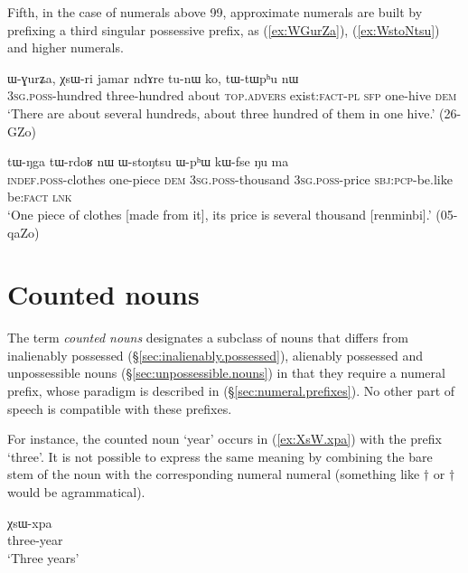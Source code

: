 Fifth, in the case of numerals above 99, approximate numerals are built by prefixing a third singular possessive  prefix, as  (\ref{ex:WGurZa}),  (\ref{ex:WstoNtsu}) and higher numerals.
 \largerpage
\begin{exe}
\ex \label{ex:WGurZa}
\gll  ɯ-ɣurʑa, χsɯ-ri jamar ndɤre tu-nɯ ko, tɯ-tɯpʰu nɯ  \\
\textsc{3sg}.\textsc{poss}-hundred three-hundred about \textsc{top}.\textsc{advers} exist:\textsc{fact}-\textsc{pl} \textsc{sfp} one-hive \textsc{dem} \\
\glt `There are about several hundreds, about three hundred of them in one hive.' (26-GZo)
\end{exe}

\begin{exe}
\ex \label{ex:WstoNtsu}
\gll  tɯ-ŋga tɯ-rdoʁ nɯ ɯ-stoŋtsu ɯ-pʰɯ kɯ-fse ŋu ma \\
\textsc{indef}.\textsc{poss}-clothes one-piece \textsc{dem} \textsc{3sg}.\textsc{poss}-thousand \textsc{3sg}.\textsc{poss}-price \textsc{sbj}:\textsc{pcp}-be.like be:\textsc{fact} \textsc{lnk} \\ 
\glt `One piece of clothes [made from it], its price is several thousand [renminbi].' (05-qaZo) 
\end{exe}

\section{Counted nouns} \label{sec:counted.nouns}
  
The term \textit{counted nouns} designates a subclass of nouns that differs from inalienably possessed (§\ref{sec:inalienably.possessed}), alienably possessed and unpossessible nouns (§\ref{sec:unpossessible.nouns}) in that they require a numeral prefix, whose paradigm is described in (§\ref{sec:numeral.prefixes}). No other part of speech is compatible with these prefixes.

For instance, the counted noun  `year' occurs in (\ref{ex:XsW.xpa}) with the prefix  `three'. It is not possible to express the same meaning by combining the bare stem of the noun  with the corresponding numeral numeral  (something  like  $\dagger$ or $\dagger$ would be agrammatical).

\begin{exe}
\ex \label{ex:XsW.xpa}
\gll χsɯ-xpa \\
three-year \\
\glt `Three years'
\end{exe}


